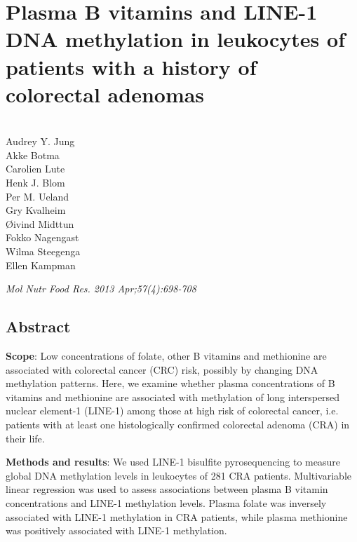 \chapter[Plasma B vitamins and LINE-1 DNA methylation in leukocytes of patients with a history of colorectal adenomas]{Plasma B vitamins and LINE-1 DNA methylation in leukocytes of patients with a history of\\colorectal adenomas}
\label{chap5_poliep} 

\quad\\
\noindent
Audrey Y. Jung\\
Akke Botma\\
Carolien Lute\\
Henk J. Blom\\
Per M. Ueland\\
Gry Kvalheim\\
{\O}ivind Midttun\\
Fokko Nagengast\\
Wilma Steegenga\\
Ellen Kampman\\

\begin{table}[b]
\emph{Mol Nutr Food Res. 2013 Apr;57(4):698-708}
\end{table}

\newpage 
 

\section*{Abstract}
\noindent \textbf{Scope}: Low concentrations of folate, other B vitamins and methionine are associated with colorectal cancer (CRC) risk, possibly by changing DNA methylation patterns. Here, we examine whether plasma concentrations of B vitamins and methionine are associated with methylation of long interspersed nuclear element-1 (LINE-1) among those at high risk of colorectal cancer, i.e. patients with at least one histologically confirmed colorectal adenoma (CRA) in their life.

\noindent \textbf{Methods and results}: We used LINE-1 bisulfite pyrosequencing to measure global DNA methylation levels in leukocytes of 281 CRA patients. Multivariable linear regression was used to assess associations between plasma B vitamin concentrations and LINE-1 methylation levels. Plasma folate was inversely associated with LINE-1 methylation in CRA patients, while plasma methionine was positively associated with LINE-1 methylation.

